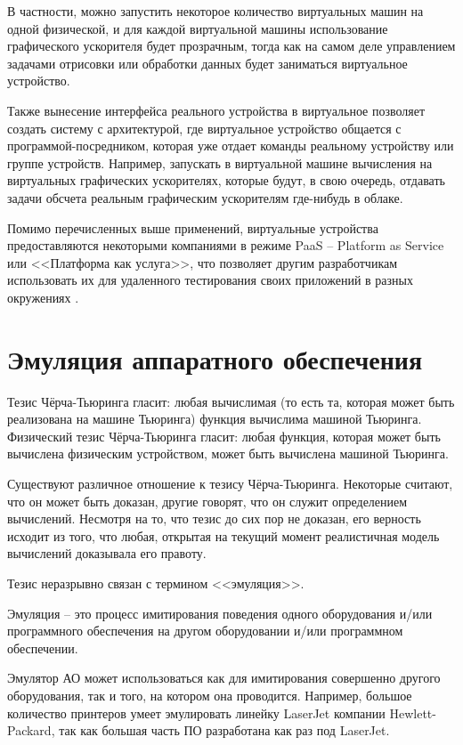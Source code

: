 В частности, можно запустить некоторое количество виртуальных машин на одной физической, и для каждой
виртуальной машины использование графического ускорителя будет прозрачным, тогда как на самом
деле управлением задачами отрисовки или обработки данных будет заниматься виртуальное устройство.

Также вынесение интерфейса реального устройства в виртуальное позволяет создать систему с архитектурой,
где виртуальное устройство общается с программой-посредником,
которая уже отдает команды реальному устройству или группе устройств.
Например, запускать в виртуальной машине вычисления на виртуальных графических ускорителях, которые
будут, в свою очередь, отдавать задачи обсчета реальным графическим ускорителям где-нибудь в облаке.

Помимо перечисленных выше применений, виртуальные устройства предоставляются некоторыми компаниями
в режиме PaaS -- Platform as Service или <<Платформа как услуга>>, что позволяет другим разработчикам
использовать их для удаленного тестирования своих приложений в разных окружениях \cite{lambdatest,genymotion}.


\section{Эмуляция аппаратного обеспечения}\label{sec:ch1/sec1}

Тезис Чёрча-Тьюринга гласит: любая вычислимая (то есть та,
которая может быть реализована на машине Тьюринга) функция вычислима машиной Тьюринга.
Физический тезис Чёрча-Тьюринга гласит: любая функция, которая может быть вычислена физическим устройством, может быть вычислена машиной Тьюринга.

Существуют различное отношение к тезису Чёрча-Тьюринга.
Некоторые считают, что он может быть доказан, другие говорят, что он служит определением вычислений.
Несмотря на то, что тезис до сих пор не доказан, его верность исходит из того, что любая, открытая на текущий момент
реалистичная модель вычислений доказывала его правоту.

Тезис неразрывно связан с термином <<эмуляция>>.

Эмуляция -- это процесс имитирования поведения одного оборудования и/или программного обеспечения
на другом оборудовании и/или программном обеспечении.

Эмулятор АО может использоваться как для имитирования совершенно другого оборудования, так и того, на котором она проводится.
Например, большое количество принтеров умеет эмулировать линейку LaserJet компании Hewlett-Packard,
так как большая часть ПО разработана как раз под LaserJet.

